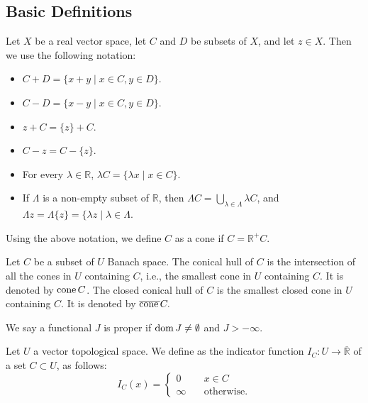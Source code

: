 


\subsection{Basic Definitions}


Let $X$ be a real  vector space, let $C$ and $D$ be subsets of $X$, and let $z \in X$. Then we use the following notation:
\begin{itemize}
	\item $C + D =\lbrace x + y \mid x \in C, y \in D\rbrace$.
	\item $C -D =\lbrace x - y \mid x \in C, y \in D\rbrace$.
	\item $z+C=\lbrace z \rbrace +C$.
	\item  $C-z=C-\lbrace z \rbrace$. 
	\item For every $\lambda \in \mathbb{R}$, $\lambda C =\lbrace\lambda x \mid x \in C\rbrace$.
	\item  If $\Lambda$ is a non-empty subset of $\mathbb{R}$, then $\Lambda C = \bigcup_{\lambda \in \Lambda}\lambda C$, and $\Lambda z = \Lambda \lbrace z \rbrace =\lbrace\lambda z \mid \lambda \in \Lambda$.
\end{itemize}
 

\begin{definition}[Cone]
	Using the above notation, we define $C$ as a cone if $C=\mathbb{R}^+C$.
\end{definition}

\begin{definition}
	Let $C$ be a subset of $U$ Banach space. The conical hull of $C$ is the intersection of all the cones in $U$ containing $C$, i.e., the smallest cone in $U$ containing $C$. It is denoted by $\mathrm{cone\,} C$. The closed conical hull of $C$ is the smallest closed cone in $U$ containing $C$. It is denoted by $\overline{\mathrm{cone\,}} C.$
\end{definition}

\begin{definition}
	We say a functional $J$ is proper if $\mathrm{dom\,} J \neq \emptyset$ and $J>-\infty$.
\end{definition}

\begin{definition}
	Let $U$ a vector topological space. We define as the indicator function $I_C:U\rightarrow \overline{\mathbb{R}}$ of a set $C \subset U$, as follows:
	\begin{equation*}
		I_C(x)=\left\lbrace
		\begin{array}{ll}
		0	&\quad x \in C \\
		\infty &\quad \text{otherwise.}
		\end{array}
		\right.
	\end{equation*}
\end{definition}

